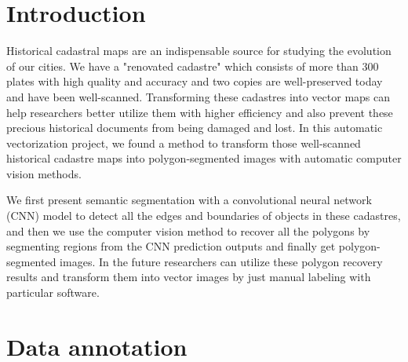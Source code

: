 \documentclass[12pt]{article}
\date{\today}
\begin{document}


\clearpage
\thispagestyle{empty}
\tableofcontents

\clearpage
{}
\setcounter{page}{1}

\section{Introduction}
Historical cadastral maps are an indispensable source for studying the evolution of our cities. We have a "renovated cadastre" which consists of more than 300 plates with high quality and accuracy and two copies are well-preserved today and have been well-scanned. Transforming these cadastres into vector maps can help researchers better utilize them with higher efficiency and also prevent these precious historical documents from being damaged and lost. In this automatic vectorization project, we found a method to transform those well-scanned historical cadastre maps into polygon-segmented images with automatic computer vision methods.

We first present semantic segmentation with a convolutional neural network (CNN) model to detect all the edges and boundaries of objects in these cadastres, and then we use the computer vision method to recover all the polygons by segmenting regions from the CNN prediction outputs and finally get polygon-segmented images. In the future researchers can utilize these polygon recovery results and transform them into vector images by just manual labeling with particular software.

\section{Data annotation}
\end{document}
